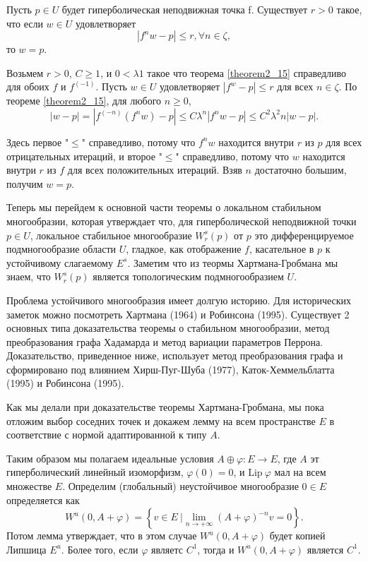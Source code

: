 \begin{theorem}
\label{theorem2_16}
Пусть $p \in U$ будет гиперболическая неподвижная точка f. Существует $r > 0$ такое, что если $w \in U$ удовлетворяет
$$
|f^n w - p| \leqslant r, \forall n \in \zeta,
$$
то $w = p$.
\end{theorem}
\begin{demo} 
Возьмем $r > 0$, $C \geqslant 1$, и $0 < \lambda 1$ такое что теорема \ref{theorem2_15} справедливо для обоих $f$  и $f^(-1)$. Пусть $w \in U$ удовлетворяет $|f^ w - p| \leqslant r$ для всех $n \in \zeta$. По теореме \ref{theorem2_15}, для любого $n \geqslant 0$,
$$
|w - p| = |f^(-n)(f^n w) - p| \leqslant C \lambda^n |f^n w - p| \leqslant C^2 \lambda^2n |w - p|.
$$

Здесь первое "$\leq$" справедливо, потому что $f^n w$ находится внутри $r$ из $p$ для всех отрицательных итераций, и второе "$\leq$" справедливо, потому что $w$ находится внутри $r$ из $f$ для всех положительных итераций. Взяв $n$  достаточно большим, получим $w = p$. 

Теперь мы перейдем к основной части теоремы о локальном стабильном многообразии, которая утверждает что, для гиперболической неподвижной точки $p \in U$, локальное стабильное многообразие $W_r^s(p)$ от $p$ это дифференцируемое подмногообразие области $U$, гладкое, как отображение $f$, касательное в $p$ к устойчивому слагаемому $E^s$. Заметим что из теормы Хартмана-Гробмана мы знаем, что $W_r^s(p)$ является топологическим подмногообразием $U$. 

Проблема устойчивого многообразия имеет долгую историю. Для исторических заметок можно посмотреть Хартмана (1964) и Робинсона (1995). Существует 2 основных типа доказательства теоремы о стабильном многообразии, метод преобразования графа Хадамарда и метод вариации параметров Перрона. Доказательство, приведенное ниже, использует метод преобразования графа и сформировано под влиянием Хирш-Пуг-Шуба (1977), Каток-Хеммельблатта (1995) и Робинсона (1995). 

Как мы делали при доказательстве теоремы Хартмана-Гробмана, мы пока отложим выбор соседних точек и докажем лемму на всем пространстве $E$ в соответствие с нормой адаптированной к типу $A$. 

Таким образом мы полагаем идеальные условия $A \oplus \varphi : E \rightarrow E$, где $A$ эт гиперболический линейный изоморфизм, $\varphi(0)=0$, и $\mathrm{Lip} \  \varphi$ мал на всем множестве $E$. Определим (глобальный) неустойчивое многообразие $0 \in E$ определяется как
$$
W^u(0,A+\varphi) = \left\{ v \in E \ | \lim_{n\rightarrow + \infty}{(A+\varphi)^{-n}v=0} \right\}.
$$
Потом лемма утверждает, что в этом случае $W^u(0,A+\varphi)$ будет копией Липшица $E^u$. Более того, если $\varphi$ являетс $C^1$, тогда и $W^u(0, A + \varphi)$ является $C^1$.
\end{demo}

